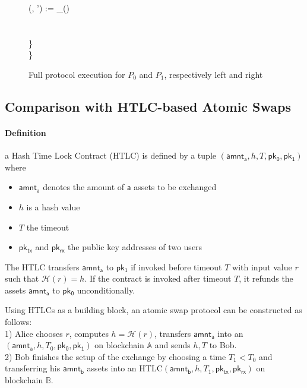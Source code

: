 \begin{figure}[H]
\begin{minipage}[t]{0.5\textwidth}
\begin{pchstack}[boxed]
{        \qquad (, ') := _() \\
        \qquad {} \:\:   \\ %
        \qquad \quad {} \perp \\
        \quad \} \\
        \} \\
    }
    \end{pchstack}
    \end{minipage}%
    \caption{Full protocol execution for $P_0$ and $P_1$, respectively left and right}
    \end{figure}

\subsection{Comparison with HTLC-based Atomic Swaps}

\paragraph*{Definition}
a Hash Time Lock Contract (HTLC) is defined by a tuple $(\mathsf{amnt_a}, h, T, \mathsf{pk_0}, \mathsf{pk_1})$ where 
\begin{itemize}
	\item $\mathsf{amnt_a}$ denotes the amount of $\mathsf{a}$ assets to be exchanged
	\item $h$ is a hash value
	\item $T$ the timeout
	\item $\mathsf{pk_{tx}}$ and $\mathsf{pk_{rx}}$ the public key addresses of two users
\end{itemize}

The HTLC transfers $\mathsf{amnt_a}$ to $\mathsf{pk_1}$ if invoked before timeout $T$ with input value $r$ such that $\mathcal{H}(r) = h$. 
If the contract is invoked after timeout $T$, it refunds the assets $\mathsf{amnt_a}$ to $\mathsf{pk_0}$ unconditionally.

Using HTLCs as a building block, an atomic swap protocol can be constructed as follows: \\
1) Alice chooses $r$, computes $h = \mathcal{H}(r)$, transfers $\mathsf{amnt_a}$ into an $(\mathsf{amnt_a}, h, T_0, \mathsf{pk_0}, \mathsf{pk_1})$ on blockchain $\mathbb{A}$ and sends $h,T$ to Bob. \\
2) Bob finishes the setup of the exchange by choosing a time $T_1 < T_0$ and transferring his $\mathsf{amnt_b}$ assets into an HTLC$(\mathsf{amnt_b}, h, T_1, \mathsf{pk_{tx}}, \mathsf{pk_{rx}})$ on blockchain $\mathbb{B}$.


